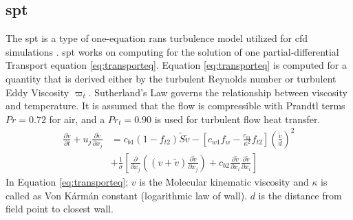 \documentclass[english]{kththesis}
\begin{document}
\subsection{\acrfull{spt}}
\sloppy
The \acrfull{spt} is a type of one-equation \acrfull{rans} turbulence model utilized for \acrshort{cfd} simulations \cite{LangleyResearchCenter2015}. \acrshort{spt} works on computing for the solution of one partial-differential Transport equation \ref{eq:transporteq}. Equation \ref{eq:transporteq} is computed for a quantity that is derived either by the turbulent Reynolds number or turbulent Eddy Viscosity $\varpi _t$. Sutherland's Law governs the relationship between viscosity and temperature. It is assumed that the flow is compressible with Prandtl terms $Pr=0.72$ for air, and a $Pr_t=0.90$ is used for turbulent flow heat transfer.  
\begin{equation}
\label{eq:transporteq}
\begin{split}
\frac{{\partial \tilde v}}{{\partial t}} + {u_j}\frac{{\partial \tilde v}}{{\partial {x_j}}} 
& = {c_{b1}}(1 - {f_{t2}})\tilde S\tilde v - \left[ {{c_{w1}}{f_w} - \frac{{{c_{b1}}}}{{{\kappa ^2}}}{f_{t2}}} \right]{\left( {\frac{{\tilde v}}{d}} \right)^2} \\
& + \frac{1}{\sigma }\left[ {\frac{\partial }{{\partial {x_j}}}\left( {\left( {v + \tilde v} \right)\frac{{\partial \tilde v}}{{\partial {x_j}}}} \right) + {c_{b2}}\frac{{\partial \tilde v}}{{\partial {x_i}}}\frac{{\partial \tilde v}}{{\partial {x_i}}}} \right] 
\end{split}
\end{equation}
In Equation \ref{eq:transporteq}; $v$ is the Molecular kinematic viscosity and $\kappa$ is called as Von Kármán constant (logarithmic law of wall). $d$ is the distance from field point to closest wall.\\
\end{document}
